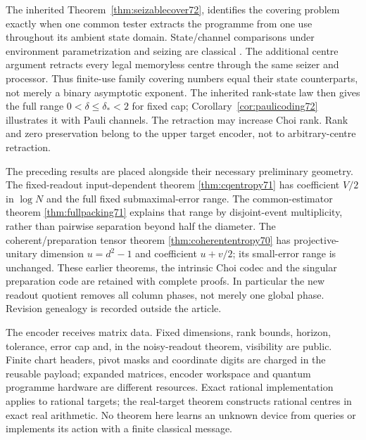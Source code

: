 The inherited Theorem~\ref{thm:seizablecover72}, identifies the
covering problem exactly when one common tester extracts the programme
from one use throughout its ambient state domain. State/channel
comparisons under environment parametrization and seizing are classical
\cite{DW72,WBHK72,WW72}. The additional centre argument retracts every
legal memoryless centre through the same seizer and processor. Thus
finite-use family covering numbers equal their state counterparts,
not merely a binary asymptotic exponent. The inherited rank-state law
then gives the full range $0<\delta\le\delta_*<2$ for fixed cap;
Corollary~\ref{cor:paulicoding72} illustrates it with Pauli channels.
The retraction may increase Choi rank. Rank and zero preservation
belong to the upper target encoder, not to arbitrary-centre retraction.

The preceding results are placed alongside their necessary preliminary
geometry. The fixed-readout input-dependent theorem
\ref{thm:cqentropy71} has coefficient $V/2$ in $\log N$ and the full
fixed submaximal-error range. The common-estimator theorem
\ref{thm:fullpacking71} explains that range by disjoint-event
multiplicity, rather than pairwise separation beyond half the diameter.
The coherent/preparation tensor theorem
\ref{thm:coherententropy70} has projective-unitary dimension $u=d^2-1$
and coefficient $u+v/2$; its small-error range is unchanged.
These earlier theorems, the intrinsic Choi codec and the singular
preparation code are retained with complete proofs. In particular the
new readout quotient removes all column phases, not merely one global
phase. Revision genealogy is recorded outside the article.

The encoder receives matrix data. Fixed dimensions, rank bounds,
horizon, tolerance, error cap and, in the noisy-readout theorem,
visibility are public. Finite chart headers,
pivot masks and coordinate digits are charged in the reusable payload;
expanded matrices, encoder workspace and quantum programme hardware
are different resources. Exact rational implementation applies to
rational targets; the real-target theorem constructs rational centres
in exact real arithmetic. No theorem here learns an unknown device
from queries or implements its action with a finite classical message.
